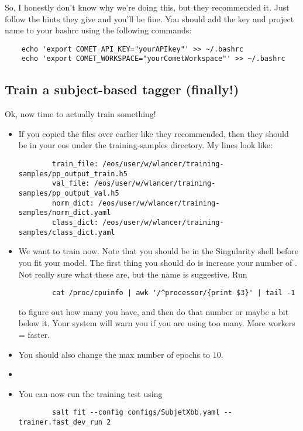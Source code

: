 \documentclass[11pt]{article}
\begin{document}
So, I honestly don't know why we're doing this, but they recommended
it. Just follow the hints they give and you'll be fine. You should add
the key and project name to your bashrc using the following commands:
\begin{verbatim}
    echo 'export COMET_API_KEY="yourAPIkey"' >> ~/.bashrc
    echo 'export COMET_WORKSPACE="yourCometWorkspace"' >> ~/.bashrc
\end{verbatim}

\subsection{Train a subject-based tagger (finally!)}

Ok, now time to actually train something! 

\begin{itemize}
    \item If you copied the files over earlier like they recommended, then
    they should be in your eos under the training-samples directory. My lines
    look like:
    \begin{verbatim}
        train_file: /eos/user/w/wlancer/training-samples/pp_output_train.h5
        val_file: /eos/user/w/wlancer/training-samples/pp_output_val.h5
        norm_dict: /eos/user/w/wlancer/training-samples/norm_dict.yaml
        class_dict: /eos/user/w/wlancer/training-samples/class_dict.yaml
    \end{verbatim}
    \item We want to train now. Note that you should be in the Singularity
    shell before you fit your model. The first thing you should do is increase
    your number of . Not really sure what these are, but the
    name is suggestive. Run
    \begin{verbatim}
        cat /proc/cpuinfo | awk '/^processor/{print $3}' | tail -1
    \end{verbatim}
    to figure out how many you have, and then do that number or maybe
    a bit below it. Your system will warn you if you are using too many.
    More workers = faster.
    \item You should also change the max number of epochs to $10$.
    \item {}
    \item You can now run the training test using
    \begin{verbatim}
        salt fit --config configs/SubjetXbb.yaml --trainer.fast_dev_run 2

\end{verbatim}
\end{itemize}
\end{document}
